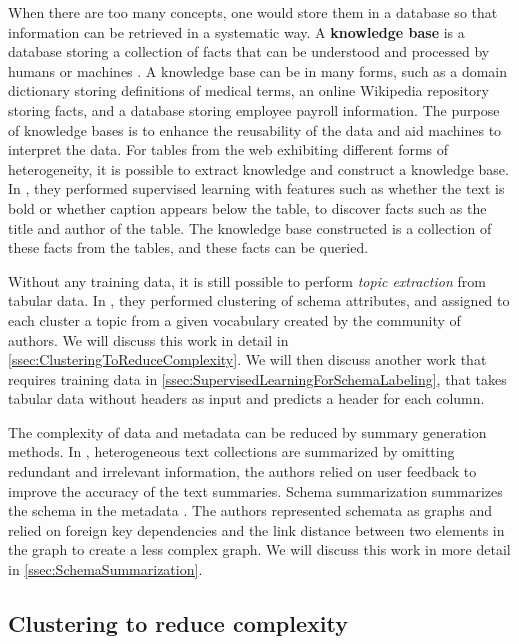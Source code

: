 When there are too many concepts, one would store them in a database so that information can be retrieved in a systematic way. A \textbf{\gls{knowledge base}} is a database storing a collection of facts that can be understood and processed by humans or machines \cite{Zhang2018Managing}. A knowledge base can be in many forms, such as a domain dictionary storing definitions of medical terms, an online Wikipedia repository storing facts, and a database storing employee payroll information. The purpose of knowledge bases is to enhance the reusability of the data and aid machines to interpret the data. For tables from the web exhibiting different forms of heterogeneity, it is possible to extract knowledge and construct a knowledge base. In \cite{10.1145/3183713.3183729}, they performed supervised learning with features such as whether the text is bold or whether caption appears below the table, to discover facts such as the title and author of the table. The knowledge base constructed is a collection of these facts from the tables, and these facts can be queried.

Without any training data, it is still possible to perform \textit{topic extraction} from tabular data. In \cite{Smith2011Unity}, they performed clustering of schema attributes, and assigned to each cluster a topic from a given vocabulary created by the community of authors. We will discuss this work in detail in \autoref{ssec:ClusteringToReduceComplexity}. We will then discuss another work that requires training data \cite{10.1145/3184558.3191601} in \autoref{ssec:SupervisedLearningForSchemaLabeling}, that takes tabular data without headers as input and predicts a header for each column.

The complexity of data and metadata can be reduced by summary generation methods. In \cite{Benjamin2019Interactive}, heterogeneous text collections are summarized by omitting redundant and irrelevant information, the authors relied on user feedback to improve the accuracy of the text summaries. Schema summarization summarizes the schema in the metadata \cite{Yu2006Schema}. The authors represented schemata as graphs and relied on foreign key dependencies and the link distance between two elements in the graph to create a less complex graph. We will discuss this work in more detail in \autoref{ssec:SchemaSummarization}.

\subsection{Clustering to reduce complexity}
\label{ssec:ClusteringToReduceComplexity}

